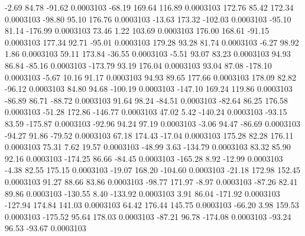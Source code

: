        -2.69       84.78      -91.62     0.0003103
      -68.19      169.64      116.89     0.0003103
      172.76       85.42      172.34     0.0003103
      -98.80       95.10      176.76     0.0003103
      -13.63      173.32     -102.03     0.0003103
      -95.10       81.14     -176.99     0.0003103
       73.46        1.22      103.69     0.0003103
      176.00      168.61      -91.15     0.0003103
      177.34       92.71      -95.01     0.0003103
      179.28       93.28       81.74     0.0003103
       -6.27       98.92        1.86     0.0003103
       59.11      173.84      -36.55     0.0003103
       -5.51       93.07       83.23     0.0003103
       94.93       86.84      -85.16     0.0003103
     -173.79       93.19      176.04     0.0003103
       93.04       87.08     -178.10     0.0003103
       -5.67       10.16       91.17     0.0003103
       94.93       89.65      177.66     0.0003103
      178.09       82.82      -96.12     0.0003103
       84.80       94.68     -100.19     0.0003103
     -147.10      169.24      119.86     0.0003103
      -86.89       86.71      -88.72     0.0003103
       91.64       98.24      -84.51     0.0003103
      -82.64       86.25      176.58     0.0003103
      -51.28      172.86     -146.77     0.0003103
       47.02        5.42     -140.24     0.0003103
      -93.15       83.59     -175.87     0.0003103
      -92.96       94.24       97.19     0.0003103
       -3.06       94.47      -86.69     0.0003103
      -94.27       91.86      -79.52     0.0003103
       67.18      174.43      -17.04     0.0003103
      175.28       82.28      176.11     0.0003103
       75.31        7.62       19.57     0.0003103
      -48.99        3.63     -134.79     0.0003103
       83.32       85.90       92.16     0.0003103
     -174.25       86.66      -84.45     0.0003103
     -165.28        8.92      -12.99     0.0003103
       -4.38       82.55      175.15     0.0003103
      -19.07      168.20     -104.60     0.0003103
      -21.18      172.98      152.45     0.0003103
       91.27       88.66       83.86     0.0003103
      -98.77      171.97       -8.97     0.0003103
      -87.26       82.41       89.86     0.0003103
     -130.55        8.40     -133.92     0.0003103
        3.91       86.04     -171.92     0.0003103
     -127.94      174.84      141.03     0.0003103
       64.42      176.44      145.75     0.0003103
      -66.20        3.98      159.53     0.0003103
     -175.52       95.64      178.03     0.0003103
      -87.21       96.78     -174.08     0.0003103
      -93.24       96.53      -93.67     0.0003103
